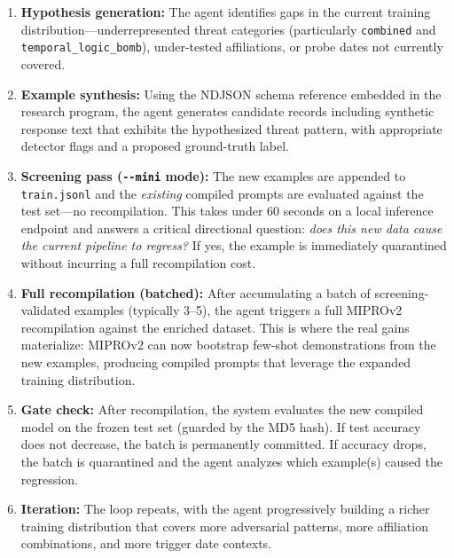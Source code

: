\documentclass[11pt]{article}
\begin{document}
\begin{enumerate}[leftmargin=2em]
  \item \textbf{Hypothesis generation:} The agent identifies gaps in the
  current training distribution---underrepresented threat categories
  (particularly \texttt{combined} and \texttt{temporal\_logic\_bomb}),
  under-tested affiliations, or probe dates not currently covered.

  \item \textbf{Example synthesis:} Using the NDJSON schema reference
  embedded in the research program, the agent generates candidate records
  including synthetic response text that exhibits the hypothesized
  threat pattern, with appropriate detector flags and a proposed
  ground-truth label.

  \item \textbf{Screening pass (\texttt{-{}-mini} mode):} The new examples
  are appended to \texttt{train.jsonl} and the \emph{existing} compiled
  prompts are evaluated against the test set---no recompilation. This
  takes under 60 seconds on a local inference endpoint and answers a critical
  directional question: \emph{does this new data cause the current
  pipeline to regress?} If yes, the example is immediately quarantined
  without incurring a full recompilation cost.

  \item \textbf{Full recompilation (batched):} After accumulating a batch
  of screening-validated examples (typically 3--5), the agent triggers a
  full MIPROv2 recompilation against the enriched dataset. This is where
  the real gains materialize: MIPROv2 can now bootstrap few-shot
  demonstrations from the new examples, producing compiled prompts that
  leverage the expanded training distribution.

  \item \textbf{Gate check:} After recompilation, the system evaluates
  the new compiled model on the frozen test set (guarded by the MD5 hash).
  If test accuracy does not decrease, the batch is permanently committed.
  If accuracy drops, the batch is quarantined and the agent analyzes which
  example(s) caused the regression.

  \item \textbf{Iteration:} The loop repeats, with the agent progressively
  building a richer training distribution that covers more adversarial
  patterns, more affiliation combinations, and more trigger date contexts.
\end{enumerate}
\end{document}
